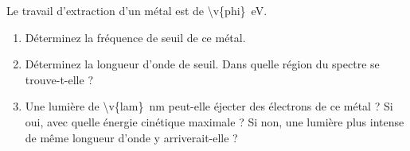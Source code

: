Le travail d'extraction d'un métal est de \qty{\v{phi}}{eV}.

\begin{enumerate}[label=\alph*)]
    \item Déterminez la fréquence de seuil de ce métal.
    \item Déterminez la longueur d'onde de seuil. Dans quelle région du spectre se trouve-t-elle ?
    \item Une lumière de \qty{\v{lam}}{nm} peut-elle éjecter des électrons de ce métal ? Si oui, avec quelle énergie cinétique maximale ? Si non, une lumière plus intense de même longueur d'onde y arriverait-elle ?
\end{enumerate}

